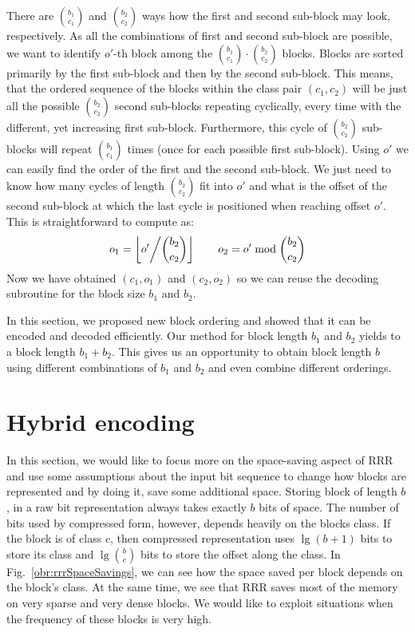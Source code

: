 There are ${b_1 \choose c_1}$ and ${b_2 \choose c_2}$ ways how the first and second
sub-block may look, respectively. As all the combinations of first and second sub-block are
possible, we want to identify $o'$-th block among the ${b_1 \choose c_1}\cdot {b_2 \choose c_2}$
blocks. Blocks are sorted primarily by the first sub-block and then by the second sub-block.
This means, that the ordered sequence of the blocks within the class pair $(c_1, c_2)$ will be
just all the possible ${b_2 \choose c_2}$ second sub-blocks repeating cyclically, every time
with the different, yet increasing first sub-block. Furthermore, this cycle of
${b_2 \choose c_2}$ sub-blocks will repeat ${b_1 \choose c_1}$ times (once for each possible
first sub-block). Using $o'$ we can easily find the order of the first and the second sub-block.
We just need to know how many cycles of length ${b_2 \choose c_2}$ fit into $o'$ and what is
the offset of the second sub-block at which the last cycle is positioned when reaching 
offset $o'$. This is straightforward to compute as:
$$o_1 = \left\lfloor o' \middle/{b_2 \choose c_2} \right\rfloor\qquad o_2 = o'\bmod {b_2 \choose c_2}$$
Now we have obtained $(c_1, o_1)$ and $(c_2, o_2)$ so we can reuse the decoding subroutine for the
block size $b_1$ and $b_2$.

In this section, we proposed new block ordering and showed that it can be encoded and decoded
efficiently. Our method for block length $b_1$ and $b_2$ yields to a block length $b_1+b_2$.
This gives us an opportunity to obtain block length $b$ using different combinations of $b_1$
and $b_2$ and even combine different orderings.

\section{Hybrid encoding}

In this section, we would like to focus more on the space-saving aspect of RRR and use some
assumptions about the input bit sequence to change how blocks are represented and by doing
it, save some additional space. Storing block of length $b$, in a raw bit representation
always takes exactly $b$ bits of space. The number of bits used by compressed form, however,
depends heavily on the blocks class. If the block is of class $c$, then compressed
representation uses $\lg (b+1)$ bits to store its class and $\lg {b\choose c}$
bits to store the offset along the class. In Fig.~\ref{obr:rrrSpaceSavings}, we can see
how the space saved per block depends on the block’s class. At the same time, we see
that RRR saves most of the memory on very sparse and very dense blocks. We would like
to exploit situations when the frequency of these blocks is very high.

